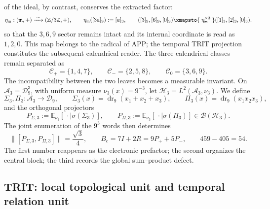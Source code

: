 of the ideal, by contrast, conserves the extracted factor:
\begin{equation}
\eta_{\mathfrak m}:(\mathfrak m,+)
\xrightarrow{\;\sim\;}(\mathbb Z/3\mathbb Z,+),
\qquad
\eta_{\mathfrak m}([3a]_9):=[a]_3,
\qquad
([3]_9,[6]_9,[0]_9)
\xmapsto{\;\eta_{\mathfrak m}^{\times3}\;}
([1]_3,[2]_3,[0]_3),
\label{p12-83-c3-s1:eq:app-369-120}
\end{equation}
so that the \(3,6,9\) sector remains intact and its internal coordinate is
read as \(1,2,0\). This map belongs to the radical of APP; the
temporal TRIT projection constitutes the subsequent calendrical reader. The
three calendrical classes
remain separated as
\[
\mathcal C_+=\{1,4,7\},\qquad
\mathcal C_-=\{2,5,8\},\qquad
\mathcal C_0=\{3,6,9\}.
\]
The incompatibility between the two leaves becomes a measurable invariant. On
\(\mathscr A_3=\mathcal D_9^3\), with uniform measure
\(\nu_3(x)=9^{-3}\), let
\(\mathcal H_3=L^2(\mathscr A_3,\nu_3)\). We define
\[
\Sigma_3,\Pi_3:\mathscr A_3\longrightarrow\mathcal D_9,
\qquad
\Sigma_3(x)=\operatorname{dr}_9(x_1+x_2+x_3),
\qquad
\Pi_3(x)=\operatorname{dr}_9(x_1x_2x_3),
\]
and the orthogonal projectors
\[
P_{\Sigma,3}:=\mathbb E_{\nu_3}[\,\cdot\mid\sigma(\Sigma_3)],
\qquad
P_{\Pi,3}:=\mathbb E_{\nu_3}[\,\cdot\mid\sigma(\Pi_3)]
\in\mathcal B(\mathcal H_3).
\]
The joint enumeration of the \(9^3\) words then determines
\[
\bigl\|[P_{\Sigma,3},P_{\Pi,3}]\bigr\|=\frac{\sqrt3}{4},
\qquad
B_c=7I+2R=9P_++5P_-,
\qquad
459-405=54.
\]
The first number reappears as the electronic prefactor; the second
organizes the central block; the third records the global sum--product
defect.

\subsection{TRIT: local topological unit and temporal relation unit}

